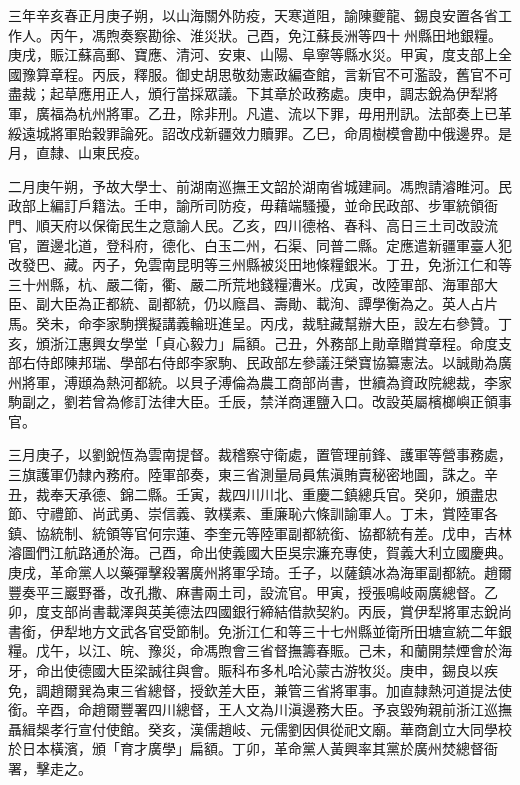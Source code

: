 \begin{pinyinscope}
三年辛亥春正月庚子朔，以山海關外防疫，天寒道阻，諭陳夔龍、錫良安置各省工作人。丙午，馮煦奏察勘徐、淮災狀。己酉，免江蘇長洲等四十州縣田地銀糧。庚戌，賑江蘇高郵、寶應、清河、安東、山陽、阜寧等縣水災。甲寅，度支部上全國豫算章程。丙辰，釋服。御史胡思敬劾憲政編查館，言新官不可濫設，舊官不可盡裁；起草應用正人，頒行當採眾議。下其章於政務處。庚申，調志銳為伊犁將軍，廣福為杭州將軍。乙丑，除非刑。凡遣、流以下罪，毋用刑訊。法部奏上已革綏遠城將軍貽穀罪論死。詔改戍新疆效力贖罪。乙巳，命周樹模會勘中俄邊界。是月，直隸、山東民疫。

二月庚午朔，予故大學士、前湖南巡撫王文韶於湖南省城建祠。馮煦請濬睢河。民政部上編訂戶籍法。壬申，諭所司防疫，毋藉端騷擾，並命民政部、步軍統領衙門、順天府以保衛民生之意諭人民。乙亥，四川德格、春科、高日三土司改設流官，置邊北道，登科府，德化、白玉二州，石渠、同普二縣。定應遣新疆軍臺人犯改發巴、藏。丙子，免雲南昆明等三州縣被災田地條糧銀米。丁丑，免浙江仁和等三十州縣，杭、嚴二衛，衢、嚴二所荒地錢糧漕米。戊寅，改陸軍部、海軍部大臣、副大臣為正都統、副都統，仍以廕昌、壽勛、載洵、譚學衡為之。英人占片馬。癸未，命李家駒撰擬講義輪班進呈。丙戌，裁駐藏幫辦大臣，設左右參贊。丁亥，頒浙江惠興女學堂「貞心毅力」扁額。己丑，外務部上勛章贈賞章程。命度支部右侍郎陳邦瑞、學部右侍郎李家駒、民政部左參議汪榮寶協纂憲法。以誠勛為廣州將軍，溥頲為熱河都統。以貝子溥倫為農工商部尚書，世續為資政院總裁，李家駒副之，劉若曾為修訂法律大臣。壬辰，禁洋商運鹽入口。改設英屬檳榔嶼正領事官。

三月庚子，以劉銳恆為雲南提督。裁稽察守衛處，置管理前鋒、護軍等營事務處，三旗護軍仍隸內務府。陸軍部奏，東三省測量局員焦滇賄賣秘密地圖，誅之。辛丑，裁奉天承德、錦二縣。壬寅，裁四川川北、重慶二鎮總兵官。癸卯，頒盡忠節、守禮節、尚武勇、崇信義、敦樸素、重廉恥六條訓諭軍人。丁未，賞陸軍各鎮、協統制、統領等官何宗蓮、李奎元等陸軍副都統銜、協都統有差。戊申，吉林濬圖們江航路通於海。己酉，命出使義國大臣吳宗濂充專使，賀義大利立國慶典。庚戌，革命黨人以藥彈擊殺署廣州將軍孚琦。壬子，以薩鎮冰為海軍副都統。趙爾豐奏平三巖野番，改孔撒、麻書兩土司，設流官。甲寅，授張鳴岐兩廣總督。乙卯，度支部尚書載澤與英美德法四國銀行締結借款契約。丙辰，賞伊犁將軍志銳尚書銜，伊犁地方文武各官受節制。免浙江仁和等三十七州縣並衛所田塘宣統二年銀糧。戊午，以江、皖、豫災，命馮煦會三省督撫籌春賑。己未，和蘭開禁煙會於海牙，命出使德國大臣梁誠往與會。賑科布多札哈沁蒙古游牧災。庚申，錫良以疾免，調趙爾巽為東三省總督，授欽差大臣，兼管三省將軍事。加直隸熱河道提法使銜。辛酉，命趙爾豐署四川總督，王人文為川滇邊務大臣。予哀毀殉親前浙江巡撫聶緝椝孝行宣付使館。癸亥，漢儒趙岐、元儒劉因俱從祀文廟。華商創立大同學校於日本橫濱，頒「育才廣學」扁額。丁卯，革命黨人黃興率其黨於廣州焚總督衙署，擊走之。


\end{pinyinscope}
